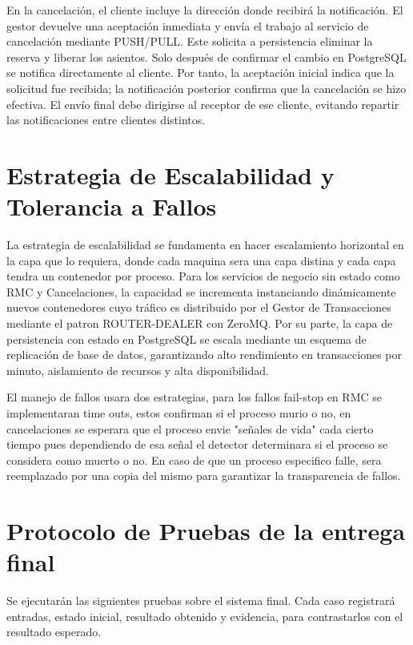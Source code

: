 \documentclass[10pt, a4paper]{article}
\begin{document}
    En la cancelación, el cliente incluye la dirección donde recibirá la notificación. El gestor devuelve una aceptación inmediata y envía el trabajo al servicio de cancelación mediante PUSH/PULL. Este solicita a persistencia eliminar la reserva y liberar los asientos. Solo después de confirmar el cambio en PostgreSQL se notifica directamente al cliente. Por tanto, la aceptación inicial indica que la solicitud fue recibida; la notificación posterior confirma que la cancelación se hizo efectiva. El envío final debe dirigirse al receptor de ese cliente, evitando repartir las notificaciones entre clientes distintos.
	
	\section{Estrategia de Escalabilidad y Tolerancia a Fallos}
	\label{sec:scalability}
	La estrategia de escalabilidad se fundamenta en hacer escalamiento horizontal en la capa que lo requiera, donde cada maquina sera una capa distina y cada capa tendra un contenedor por proceso. Para los servicios de negocio sin estado como RMC y Cancelaciones, la capacidad se incrementa instanciando dinámicamente nuevos contenedores cuyo tráfico es distribuido por el Gestor de Transacciones mediante el patron ROUTER-DEALER con ZeroMQ. Por su parte, la capa de persistencia con estado en PostgreSQL se escala mediante un esquema de replicación de base de datos, garantizando alto rendimiento en transacciones por minuto, aislamiento de recursos y alta disponibilidad.
	
	El manejo de fallos usara dos estrategias, para los fallos fail-stop en RMC se implementaran time outs, estos confirman si el proceso murio o no, en cancelaciones se esperara que el proceso envie "señales de vida" cada cierto tiempo pues dependiendo de esa señal el detector determinara si el proceso se considera como muerto o no. En caso de que un proceso especifico falle, sera reemplazado por una copia del mismo para garantizar la transparencia de fallos.

	\section{Protocolo de Pruebas de la entrega final}
	\label{sec:protocol}
    Se ejecutarán las siguientes pruebas sobre el sistema final. Cada caso registrará entradas, estado inicial, resultado obtenido y evidencia, para contrastarlos con el resultado esperado.
\end{document}
